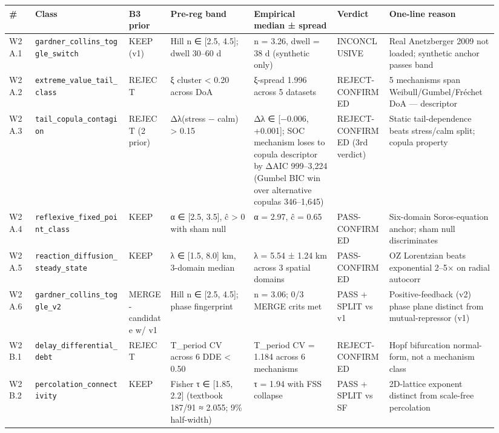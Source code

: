 \documentclass[
  11pt]{article}
\newcounter{none} %
\begin{document}
{\def\LTcaptype{none} %
\begin{longtable}[]{@{}p{0.05\linewidth}p{0.18\linewidth}p{0.08\linewidth}p{0.16\linewidth}p{0.16\linewidth}p{0.10\linewidth}p{0.21\linewidth}@{}}
\toprule\noalign{}
\# & Class & B3 prior & Pre-reg band & Empirical median ± spread & Verdict & One-line reason \\
\midrule\noalign{}
\endhead
\bottomrule\noalign{}
\endlastfoot
W2A.1 & \texttt{gardner\_collins\_toggle\_switch} & KEEP (v1) & Hill n ∈ [2.5, 4.5]; dwell 30--60 d & n = 3.26, dwell = 38 d (synthetic only) & INCONCLUSIVE & Real Anetzberger 2009 not loaded; synthetic anchor passes band \\
W2A.2 & \texttt{extreme\_value\_tail\_class} & REJECT & ξ cluster < 0.20 across DoA & ξ-spread 1.996 across 5 datasets & REJECT-CONFIRMED & 5 mechanisms span Weibull/Gumbel/Fréchet DoA --- descriptor \\
W2A.3 & \texttt{tail\_copula\_contagion} & REJECT (2 prior) & Δλ(stress − calm) > 0.15 & Δλ ∈ [−0.006, +0.001]; SOC mechanism loses to copula descriptor by ΔAIC 999--3{,}224 (Gumbel BIC win over alternative copulas 346--1{,}645) & REJECT-CONFIRMED (3rd verdict) & Static tail-dependence beats stress/calm split; copula property \\
W2A.4 & \texttt{reflexive\_fixed\_point\_class} & KEEP & α ∈ [2.5, 3.5], ĉ > 0 with sham null & α = 2.97, ĉ = 0.65 & PASS-CONFIRMED & Six-domain Soros-equation anchor; sham null discriminates \\
W2A.5 & \texttt{reaction\_diffusion\_steady\_state} & KEEP & λ ∈ [1.5, 8.0] km, 3-domain median & λ = 5.54 ± 1.24 km across 3 spatial domains & PASS-CONFIRMED & OZ Lorentzian beats exponential 2--5× on radial autocorr \\
W2A.6 & \texttt{gardner\_collins\_toggle\_v2} & MERGE-candidate w/ v1 & Hill n ∈ [2.5, 4.5]; phase fingerprint & n = 3.06; 0/3 MERGE crits met & PASS + SPLIT vs v1 & Positive-feedback (v2) phase plane distinct from mutual-repressor (v1) \\
W2B.1 & \texttt{delay\_differential\_debt} & REJECT & T\_period CV across 6 DDE < 0.50 & T\_period CV = 1.184 across 6 mechanisms & REJECT-CONFIRMED & Hopf bifurcation normal-form, not a mechanism class \\
W2B.2 & \texttt{percolation\_connectivity} & KEEP & Fisher τ ∈ [1.85, 2.2] (textbook 187/91 ≈ 2.055; 9\% half-width) & τ = 1.94 with FSS collapse & PASS + SPLIT vs SF & 2D-lattice exponent distinct from scale-free percolation \\

\end{longtable}}
\end{document}
